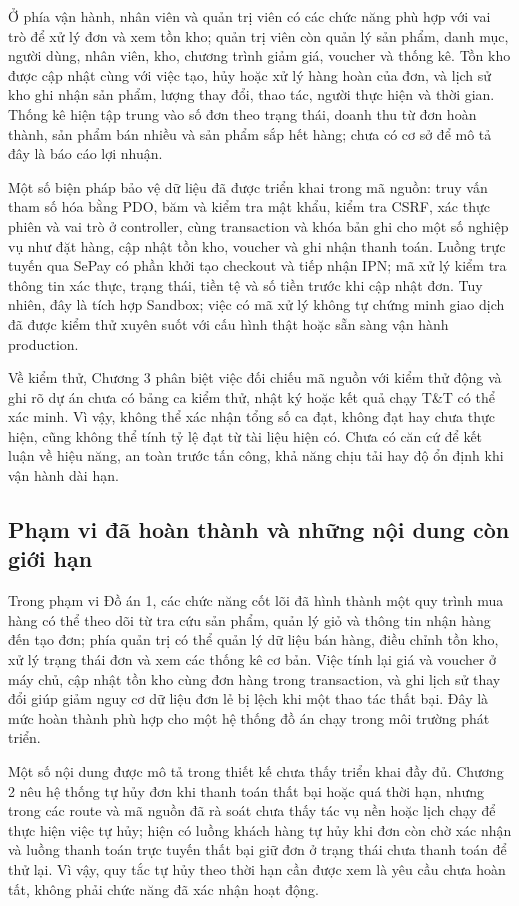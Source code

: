 Ở phía vận hành, nhân viên và quản trị viên có các chức năng phù hợp với vai trò để xử lý đơn và xem tồn kho; quản trị viên còn quản lý sản phẩm, danh mục, người dùng, nhân viên, kho, chương trình giảm giá, voucher và thống kê. Tồn kho được cập nhật cùng với việc tạo, hủy hoặc xử lý hàng hoàn của đơn, và lịch sử kho ghi nhận sản phẩm, lượng thay đổi, thao tác, người thực hiện và thời gian. Thống kê hiện tập trung vào số đơn theo trạng thái, doanh thu từ đơn hoàn thành, sản phẩm bán nhiều và sản phẩm sắp hết hàng; chưa có cơ sở để mô tả đây là báo cáo lợi nhuận.

Một số biện pháp bảo vệ dữ liệu đã được triển khai trong mã nguồn: truy vấn tham số hóa bằng PDO, băm và kiểm tra mật khẩu, kiểm tra CSRF, xác thực phiên và vai trò ở controller, cùng transaction và khóa bản ghi cho một số nghiệp vụ như đặt hàng, cập nhật tồn kho, voucher và ghi nhận thanh toán. Luồng trực tuyến qua SePay có phần khởi tạo checkout và tiếp nhận IPN; mã xử lý kiểm tra thông tin xác thực, trạng thái, tiền tệ và số tiền trước khi cập nhật đơn. Tuy nhiên, đây là tích hợp Sandbox; việc có mã xử lý không tự chứng minh giao dịch đã được kiểm thử xuyên suốt với cấu hình thật hoặc sẵn sàng vận hành production.

Về kiểm thử, Chương 3 phân biệt việc đối chiếu mã nguồn với kiểm thử động và ghi rõ dự án chưa có bảng ca kiểm thử, nhật ký hoặc kết quả chạy T\&T có thể xác minh. Vì vậy, không thể xác nhận tổng số ca đạt, không đạt hay chưa thực hiện, cũng không thể tính tỷ lệ đạt từ tài liệu hiện có. Chưa có căn cứ để kết luận về hiệu năng, an toàn trước tấn công, khả năng chịu tải hay độ ổn định khi vận hành dài hạn.

\subsection{Phạm vi đã hoàn thành và những nội dung còn giới hạn}

Trong phạm vi Đồ án 1, các chức năng cốt lõi đã hình thành một quy trình mua hàng có thể theo dõi từ tra cứu sản phẩm, quản lý giỏ và thông tin nhận hàng đến tạo đơn; phía quản trị có thể quản lý dữ liệu bán hàng, điều chỉnh tồn kho, xử lý trạng thái đơn và xem các thống kê cơ bản. Việc tính lại giá và voucher ở máy chủ, cập nhật tồn kho cùng đơn hàng trong transaction, và ghi lịch sử thay đổi giúp giảm nguy cơ dữ liệu đơn lẻ bị lệch khi một thao tác thất bại. Đây là mức hoàn thành phù hợp cho một hệ thống đồ án chạy trong môi trường phát triển.

Một số nội dung được mô tả trong thiết kế chưa thấy triển khai đầy đủ. Chương 2 nêu hệ thống tự hủy đơn khi thanh toán thất bại hoặc quá thời hạn, nhưng trong các route và mã nguồn đã rà soát chưa thấy tác vụ nền hoặc lịch chạy để thực hiện việc tự hủy; hiện có luồng khách hàng tự hủy khi đơn còn chờ xác nhận và luồng thanh toán trực tuyến thất bại giữ đơn ở trạng thái chưa thanh toán để thử lại. Vì vậy, quy tắc tự hủy theo thời hạn cần được xem là yêu cầu chưa hoàn tất, không phải chức năng đã xác nhận hoạt động.

